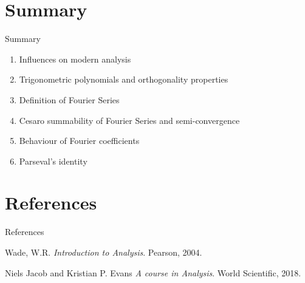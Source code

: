 \documentclass{beamer}
\begin{document}
\section{Summary}
\begin{frame}{Summary}
    \small
    \begin{enumerate}
        \item Influences on modern analysis
        \item Trigonometric polynomials and orthogonality properties
        \item Definition of Fourier Series
        \item Cesaro summability of Fourier Series and semi-convergence
        \item Behaviour of Fourier coefficients
        \item Parseval's identity
    \end{enumerate}
\end{frame}

\section{References}


\begin{frame}[allowframebreaks]{References}
\small
    \begin{thebibliography}{}


        Wade, W.R.
        \newblock \emph{Introduction to Analysis}.
        \newblock Pearson, 2004.

        Niels Jacob and Kristian P. Evans
        \newblock \emph{A course in Analysis}.
        \newblock World Scientific, 2018.


    \end{thebibliography}
\end{frame}
\end{document}
